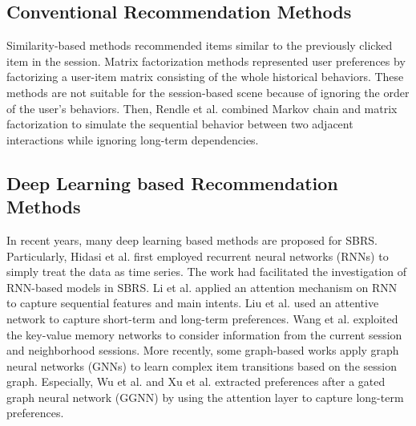 \documentclass[runningheads]{llncs}
\begin{document}
\subsection{Conventional Recommendation Methods}
Similarity-based methods \cite{DBLP:conf/www/SarwarKKR01}  recommended items similar to the previously clicked item in the session.
Matrix factorization methods \cite{DBLP:conf/uai/RendleFGS09,DBLP:reference/rsh/KorenB11} represented user preferences by factorizing a user-item matrix consisting of the whole historical behaviors.
These methods are not suitable for the session-based scene because of ignoring the order of the user's behaviors.
Then, Rendle et al. \cite{DBLP:conf/www/RendleFS10} combined Markov chain and matrix factorization to simulate the sequential behavior between two adjacent interactions while ignoring long-term dependencies.



\subsection{Deep Learning based Recommendation Methods}
In recent years, many deep learning based methods are proposed for SBRS.
Particularly, 
Hidasi et al. \cite{DBLP:journals/corr/HidasiKBT15} first employed recurrent neural networks (RNNs) \cite{1986Serial} to simply treat the data as time series.
The work had facilitated the investigation of RNN-based models \cite{DBLP:conf/aaai/RenCLR0R19} in SBRS.
Li et al. \cite{DBLP:conf/cikm/LiRCRLM17} applied an attention mechanism on RNN to capture sequential features and main intents. Liu et al. \cite{DBLP:conf/kdd/LiuZMZ18} used an attentive network to capture short-term and long-term preferences.
Wang et al. \cite{DBLP:conf/sigir/WangRMCMR19} exploited the key-value memory networks \cite{DBLP:conf/emnlp/MillerFDKBW16} to consider information from the current session and neighborhood sessions.
More recently, some graph-based works \cite{DBLP:conf/aaai/WuT0WXT19,DBLP:conf/ijcai/XuZLSXZFZ19,DBLP:conf/kdd/ChenW20,DBLP:conf/cikm/PanCCCR20,DBLP:conf/cikm/QiuLHY19} apply graph neural networks (GNNs) \cite{DBLP:journals/corr/LiTBZ15,DBLP:journals/tnn/ScarselliGTHM09,DBLP:conf/iclr/VelickovicCCRLB18} to learn complex item transitions based on the session graph.
Especially, Wu et al. \cite{DBLP:conf/aaai/WuT0WXT19} and Xu et al. \cite{DBLP:conf/ijcai/XuZLSXZFZ19} extracted preferences after a gated graph neural network (GGNN) \cite{DBLP:journals/corr/LiTBZ15} by using the attention layer to capture long-term preferences.
\end{document}
